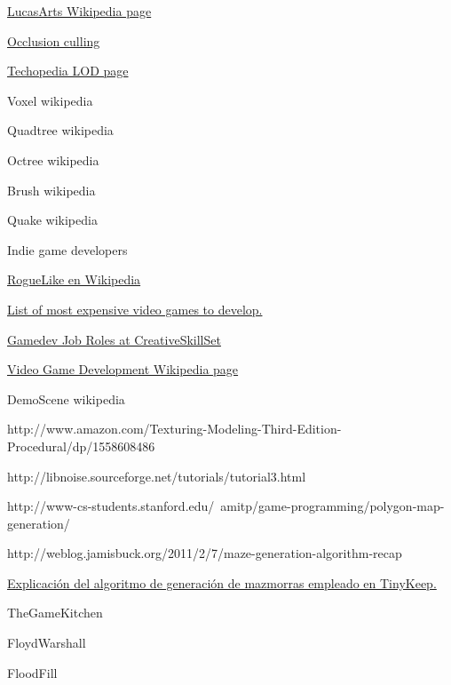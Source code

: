 \begin{thebibliography}{99}


 \href{https://es.wikipedia.org/wiki/LucasArts}{LucasArts Wikipedia page}

 \href{https://en.wikipedia.org/wiki/Hidden_surface_determination}{Occlusion culling}

 \href{http://www.techopedia.com/definition/11791/level-of-detail-lod}{Techopedia LOD page}

 Voxel wikipedia

 Quadtree wikipedia

 Octree wikipedia

 Brush wikipedia

 Quake wikipedia

 Indie game developers

 \href{https://es.wikipedia.org/wiki/Roguelike}{RogueLike en Wikipedia}

 \href{https://en.wikipedia.org/wiki/List_of_most_expensive_video_games_to_develop}{List of most expensive video games to develop.}

 \href{http://creativeskillset.org/creative_industries/games/job_roles}{Gamedev Job Roles at CreativeSkillSet}

 \href{https://en.wikipedia.org/wiki/Video_game_development#Roles}{Video Game Development Wikipedia page}

 DemoScene wikipedia

 http://www.amazon.com/Texturing-Modeling-Third-Edition-Procedural/dp/1558608486

 http://libnoise.sourceforge.net/tutorials/tutorial3.html

 http://www-cs-students.stanford.edu/~amitp/game-programming/polygon-map-generation/

 http://weblog.jamisbuck.org/2011/2/7/maze-generation-algorithm-recap

 \href{http://www.reddit.com/r/gamedev/comments/1dlwc4/procedural_dungeon_generation_algorithm_explained/}{Explicación del algoritmo de generación de mazmorras empleado en TinyKeep.}

 TheGameKitchen

 FloydWarshall

 FloodFill

\end{thebibliography}







